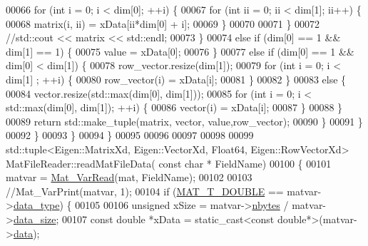 \begin{DoxyCode}
{{{{00066                         \textcolor{keywordflow}{for} (\textcolor{keywordtype}{int} i = 0; i < dim[0]; ++i) \{
00067                             \textcolor{keywordflow}{for} (\textcolor{keywordtype}{int} ii = 0; ii < dim[1]; ii++) \{
00068                                 matrix(i, ii) = xData[ii*dim[0] + i];
00069                             \}
00070 
00071                         \}
00072                         \textcolor{comment}{//std::cout << matrix << std::endl;}
00073                     \}
00074                     \textcolor{keywordflow}{else} \textcolor{keywordflow}{if} (dim[0] == 1 && dim[1] == 1) \{
00075                         value = xData[0];
00076                     \}
00077                     \textcolor{keywordflow}{else} \textcolor{keywordflow}{if} (dim[0] == 1 && dim[0] < dim[1]) \{
00078                         row\_vector.resize(dim[1]);
00079                         \textcolor{keywordflow}{for} (\textcolor{keywordtype}{int} i = 0; i < dim[1] ; ++i) \{
00080                             row\_vector(i) = xData[i];
00081                         \}
00082                     \}   
00083                     \textcolor{keywordflow}{else} \{
00084                         vector.resize(std::max(dim[0], dim[1]));
00085                         \textcolor{keywordflow}{for} (\textcolor{keywordtype}{int} i = 0; i < std::max(dim[0], dim[1]); ++i) \{
00086                             vector(i) = xData[i];
00087                         \}
00088                     \}
00089                     \textcolor{keywordflow}{return} std::make\_tuple(matrix, vector, value,row\_vector);
00090                 \}
00091             \}
00092         \}
00093     \}
00094 \}
00095 
00096 
00097 
00098 
00099 std::tuple<Eigen::MatrixXd, Eigen::VectorXd, Float64, Eigen::RowVectorXd> MatFileReader::readMatFileData(\textcolor{keyword}{
      const} \textcolor{keywordtype}{char} * FieldName)
00100 \{
00101     matvar = \hyperlink{group___m_a_t_ga3505f63029763eaa73d5a19f1115eb42}{Mat\_VarRead}(mat, FieldName);
00102 
00103     \textcolor{comment}{//Mat\_VarPrint(matvar, 1);}
00104     \textcolor{keywordflow}{if} (\hyperlink{group___m_a_t_ggacf7b3b879282b7ab3a51190e49bf3453a31e721ecf7e188196f83c32838288797}{MAT\_T\_DOUBLE} == matvar->\hyperlink{group___m_a_t_ab6aafe9bd77f0f077852593dec438144}{data\_type}) \{
00105 
00106         \textcolor{keywordtype}{unsigned} xSize = matvar->\hyperlink{group___m_a_t_abf1c844540503be2df9bb3db93cfe307}{nbytes} / matvar->\hyperlink{group___m_a_t_a9ad1c82e2b568da617e12dc73a26e1f9}{data\_size};
00107         \textcolor{keyword}{const} \textcolor{keywordtype}{double} *xData = \textcolor{keyword}{static\_cast<}\textcolor{keyword}{const }\textcolor{keywordtype}{double}*\textcolor{keyword}{>}(matvar->\hyperlink{group___m_a_t_a5672978efa230bbdecdf38ede781f7fa}{data});
}}}}
\end{DoxyCode}
